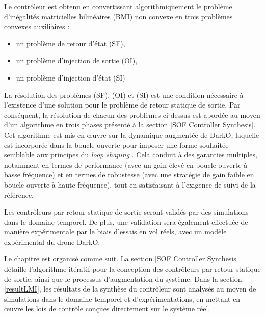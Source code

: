 Le contrôleur est obtenu en convertissant algorithmiquement le problème d'inégalités matricielles bilinéaires (BMI) non convexe en trois problèmes convexes auxiliaires :
\begin{itemize}
    \item un problème de retour d'état (SF),
    \item un problème d'injection de sortie (OI),
    \item un problème d'injection d'état (SI)
\end{itemize}



La résolution des problèmes (SF), (OI) et (SI) est une condition nécessaire à l'existence d'une solution pour le problème de retour statique de sortie. Par conséquent, la résolution de chacun des problèmes ci-dessus est abordée au moyen d'un algorithme en trois phases présenté à la section \ref{SOF Controller Synthesis}. Cet algorithme est mis en œuvre sur la dynamique augmentée de DarkO, laquelle est incorporée dans la boucle ouverte pour imposer une forme souhaitée semblable aux principes du \textit{loop shaping} \cite{McFarlane1992}. Cela conduit à des garanties multiples, notamment en termes de performance (avec un gain élevé en boucle ouverte à basse fréquence) et en termes de robustesse (avec une stratégie de gain faible en boucle ouverte à haute fréquence), tout en satisfaisant à l'exigence de suivi de la référence. 

Les contrôleurs par retour statique de sortie seront validés par des simulations dans le domaine temporel. De plus, une validation sera également effectuée de manière expérimentale par le biais d'essais en vol réels, avec un modèle expérimental du drone DarkO. 

Le chapitre est organisé comme suit. La section \ref{SOF Controller Synthesis} détaille l'algorithme itératif pour la conception des contrôleurs par retour statique de sortie, ainsi que le processus d'augmentation du système. Dans la section \ref{resultLMI}, les résultats de la synthèse du contrôleur sont analysés au moyen de simulations dans le domaine temporel et d'expérimentations, en mettant en œuvre les lois de contrôle conçues directement sur le système réel. 



